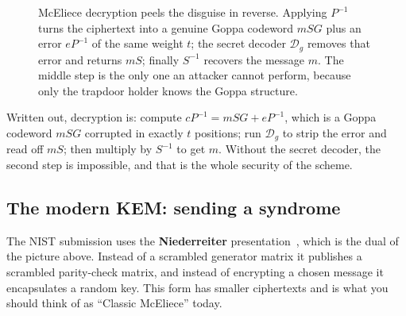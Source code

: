 \begin{figure}[H]
\centering
{}
\caption{McEliece decryption peels the disguise in reverse. Applying $P^{-1}$ turns the ciphertext into a genuine Goppa codeword $mSG$ plus an error $eP^{-1}$ of the same weight $t$; the secret decoder $\mathcal{D}_g$ removes that error and returns $mS$; finally $S^{-1}$ recovers the message $m$. The middle step is the only one an attacker cannot perform, because only the trapdoor holder knows the Goppa structure.}
\label{fig:mceliece-decrypt}
\end{figure}

Written out, decryption is: compute $cP^{-1} = mSG + eP^{-1}$, which is a Goppa codeword $mSG$ corrupted in exactly $t$ positions; run $\mathcal{D}_g$ to strip the error and read off $mS$; then multiply by $S^{-1}$ to get $m$. Without the secret decoder, the second step is impossible, and that is the whole security of the scheme.

\subsection{The modern KEM: sending a syndrome}

The NIST submission uses the \textbf{Niederreiter} presentation~\cite{niederreiter1986}, which is the dual of the picture above. Instead of a scrambled generator matrix it publishes a scrambled parity-check matrix, and instead of encrypting a chosen message it encapsulates a random key. This form has smaller ciphertexts and is what you should think of as ``Classic McEliece'' today.

